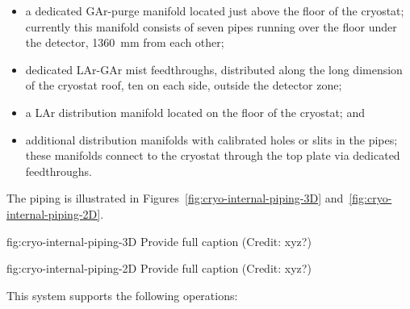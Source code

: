 \begin{itemize}
\item a dedicated GAr-purge manifold located just above the floor of the cryostat; currently this manifold consists of seven pipes running over the floor under the detector, \SI{1360}{mm} from each other;
\item dedicated LAr-GAr mist feedthroughs, distributed along the long dimension of the cryostat roof, ten on each side, outside the detector zone;
\item a LAr distribution manifold located on the floor of the cryostat; and
\item additional distribution manifolds with calibrated holes or slits in the pipes;
these manifolds connect to the cryostat through the top plate via dedicated feedthroughs.
\end{itemize}

The piping is illustrated in Figures~\ref{fig:cryo-internal-piping-3D} and~\ref{fig:cryo-internal-piping-2D}.
\begin{dunefigure}{fig:cryo-internal-piping-3D}
     {Provide full caption (Credit: xyz?)}
\end{dunefigure}

\begin{dunefigure}{fig:cryo-internal-piping-2D}
     {Provide full caption (Credit: xyz?)}
\end{dunefigure}

This system supports the following operations:

